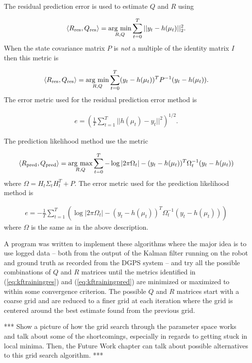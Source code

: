 The residual prediction error is used to estimate $Q$ and $R$ using

\begin{align*}
\left<R_{\text{res}},Q_{\text{res}}\right> = \mathop{\arg\,\min}\limits_{R,Q}\sum_{t=0}^T ||y_t-h(\mu_t)||_2^2.
\end{align*}
When the state covariance matrix $P$ is \textit{not} a multiple of the identity matrix $I$ then this metric is

\begin{align*}
\left<R_{\text{res}},Q_{\text{res}}\right> = \mathop{\arg\,\min}\limits_{R,Q}\sum_{t=0}^T (y_t-h(\mu_t))^TP^{-1}(y_t-h(\mu_t)).
\end{align*}
The error metric used for the residual prediction error method is

\begin{align}
\label{eq:kftrainingres}
e = \left(\frac{1}{T}\sum_{t=1}^T ||h(\mu_t)-y_t||^2\right)^{1/2}.
\end{align}

The prediction likelihood method use the metric

\begin{align*}
\left<R_{\text{pred}},Q_{\text{pred}}\right> = \mathop{\arg\,\max}\limits_{R,Q}\sum_{t=0}^T -\log|2\pi\Omega_t| - (y_t-h(\mu_t))^T\Omega_t^{-1}(y_t-h(\mu_t))
\end{align*}
where $\Omega = H_t\Sigma_tH_t^T+P$. The error metric used for the prediction likelihood method is

\begin{align}
\label{eq:kftrainingpred}
e = -\frac{1}{T}\sum_{t=1}^T \left(\log|2\pi\Omega_t| - (y_t-h(\mu_t))^T\Omega_t^{-1}(y_t-h(\mu_t))\right)
\end{align}
where $\Omega$ is the same as in the above description.

A program was written to implement these algorithms where the major idea is to use logged data -- both from the output of the Kalman filter running on the robot and ground truth as recorded from the DGPS system -- and try all the possible combinations of $Q$ and $R$ matrices until the metrics identified in (\ref{eq:kftrainingres}) and (\ref{eq:kftrainingpred}) are minimized or maximized to within some convergence criterion. The possible $Q$ and $R$ matrices start with a coarse grid and are reduced to a finer grid at each iteration where the grid is centered around the best estimate found from the previous grid.

*** Show a picture of how the grid search through the parameter space works and talk about some of the shortcomings, especially in regards to getting stuck in local minima. Then, the Future Work chapter can talk about possible alternatives to this grid search algorithm. ***

